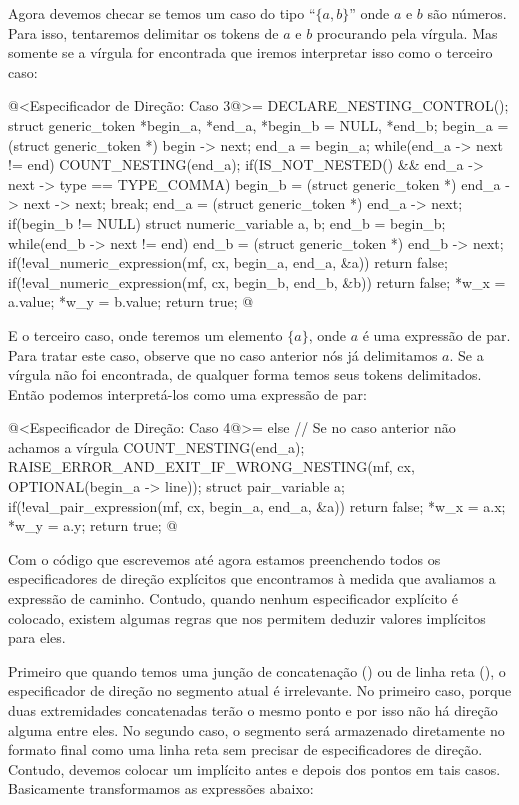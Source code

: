{{{{{{Agora devemos checar se temos um caso do tipo ``$\{ a , b\}$'' onde
$a$ e $b$ são números. Para isso, tentaremos delimitar os tokens de
$a$ e $b$ procurando pela vírgula. Mas somente se a vírgula for
encontrada que iremos interpretar isso como o terceiro caso:

\iniciocodigo
@<Especificador de Direção: Caso 3@>=
DECLARE_NESTING_CONTROL();
struct generic_token *begin_a, *end_a, *begin_b = NULL, *end_b;
begin_a = (struct generic_token *) begin -> next;
end_a = begin_a;
while(end_a -> next != end){
  COUNT_NESTING(end_a);
  if(IS_NOT_NESTED() && end_a -> next -> type == TYPE_COMMA){
    begin_b = (struct generic_token *) end_a -> next -> next;
    break;
  }
  end_a = (struct generic_token *) end_a -> next;
}
if(begin_b != NULL){
  struct numeric_variable a, b;
  end_b = begin_b;
  while(end_b -> next != end)
    end_b = (struct generic_token *) end_b -> next;
  if(!eval_numeric_expression(mf, cx, begin_a, end_a, &a))
    return false;
  if(!eval_numeric_expression(mf, cx, begin_b, end_b, &b))
    return false;
  *w_x = a.value;
  *w_y = b.value;
  return true;
}
@
\fimcodigo

E o terceiro caso, onde teremos um elemento $\{a\}$, onde $a$ é uma
expressão de par. Para tratar este caso, observe que no caso anterior
nós já delimitamos $a$. Se a vírgula não foi encontrada, de qualquer
forma temos seus tokens delimitados. Então podemos interpretá-los como
uma expressão de par:

\iniciocodigo
@<Especificador de Direção: Caso 4@>=
else{ // Se no caso anterior não achamos a vírgula
  COUNT_NESTING(end_a);
  RAISE_ERROR_AND_EXIT_IF_WRONG_NESTING(mf, cx, OPTIONAL(begin_a -> line));
  struct pair_variable a;
  if(!eval_pair_expression(mf, cx, begin_a, end_a, &a))
    return false;
  *w_x = a.x;
  *w_y = a.y;
  return true;
}
@
\fimcodigo

Com o código que escrevemos até agora estamos preenchendo todos os
especificadores de direção explícitos que encontramos à medida que
avaliamos a expressão de caminho. Contudo, quando nenhum especificador
explícito é colocado, existem algumas regras que nos permitem deduzir
valores implícitos para eles.

Primeiro que quando temos uma junção de concatenação (\monoespaco{\&})
ou de linha reta (\monoespaco{-{}-}), o especificador de direção no
segmento atual é irrelevante. No primeiro caso, porque duas
extremidades concatenadas terão o mesmo ponto e por isso não há
direção alguma entre eles. No segundo caso, o segmento será armazenado
diretamente no formato final como uma linha reta sem precisar de
especificadores de direção. Contudo, devemos colocar
um  implícito antes e depois dos pontos em tais
casos. Basicamente transformamos as expressões abaixo:

}}}}}}

